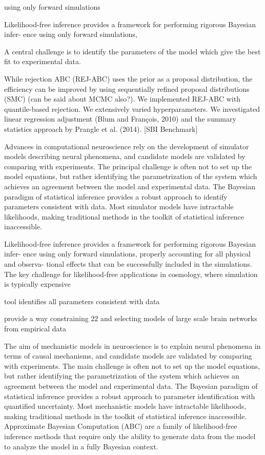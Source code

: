 using only forward simulations

Likelihood-free inference provides a framework for performing rigorous Bayesian infer- ence using only forward simulations,

A central challenge is to identify the parameters of the model which give the best fit to experimental data. 


While rejection ABC (REJ-ABC) uses the prior as a proposal distribution, the efficiency can be improved by using sequentially refined proposal distributions (SMC) (can be said about MCMC also?). We implemented REJ-ABC with quantile-based rejection. 
We extensively varied hyperparameters. We investigated linear regression adjustment (Blum and François, 2010) and the summary statistics approach
by Prangle et al. (2014). [SBI Benchmark]



Advances in computational neuroscience rely on the development of simulator models describing neural phenomena, and candidate models are validated by comparing with experiments. The principal challenge is often not to set up the model equations, but rather identifying the parametrization of the system which achieves an agreement between the model and experimental data. The Bayesian paradigm of statistical inference provides a robust approach to identify parameters consistent with data. Most simulator models have intractable likelihoods, making traditional methods in the toolkit of statistical inference inaccessible. 


Likelihood-free inference provides a framework for performing rigorous Bayesian infer- ence using only forward simulations, properly accounting for all physical and observa- tional effects that can be successfully included in the simulations. The key challenge for likelihood-free applications in cosmology, where simulation is typically expensive


tool identifies all parameters consistent with data

provide a way constraining
22 and selecting models of large scale brain networks from empirical data

The aim of mechanistic models in neuroscience is to explain neural phenomena in terms of causal mechanisms, and candidate models are validated by comparing with experiments. The main challenge is often not to set up the model equations, but rather identifying the parametrization of the system which achieves an agreement between the model and experimental data. The Bayesian paradigm of statistical inference provides a robust approach to parameter identification with quantified uncertainty. Most mechanistic models have intractable likelihoods, making traditional methods in the toolkit of statistical inference inaccessible. Approximate Bayesian Computation (ABC) are a family of likelihood-free inference methods that require only the ability to generate data from the model to analyze the model in a fully Bayesian context.

